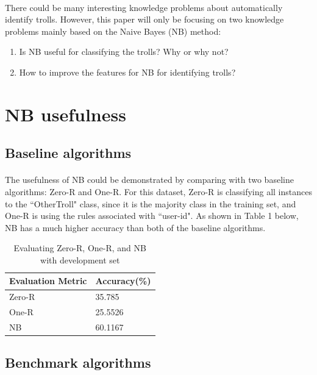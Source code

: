 \documentclass[11pt]{article}
\begin{document}
\paragraph{} There could be many interesting knowledge problems about automatically identify trolls. However, this paper will only be focusing on two knowledge problems mainly based on the Naive Bayes (NB) method:
\begin{enumerate}
\item
Is NB useful for classifying the trolls?  Why or why not?
\item
How to improve the features for NB for identifying trolls?
\end{enumerate}
\section{NB usefulness}

\subsection{Baseline algorithms}
\paragraph{} The usefulness of NB could be demonstrated by comparing with two baseline algorithms: Zero-R and One-R. For this dataset, Zero-R is classifying all instances to the ``OtherTroll" class, since it is the majority class in the training set, and One-R is using the rules associated with ``user-id". As shown in Table 1 below, NB has a much higher accuracy than both of the baseline algorithms.

\begin{table}[!htbp]
 \begin{center}
\begin{tabular}{| l | l |}
      \hline
      Evaluation Metric & Accuracy(\%) \\
      \hline\hline
      Zero-R & 35.785 \\
      One-R & 25.5526 \\
      NB &  60.1167\\
      \hline
\end{tabular}
\caption{Evaluating Zero-R, One-R, and NB with development set}\label{table1}
 \end{center}
\end{table}

\subsection{Benchmark algorithms}
\end{document}
